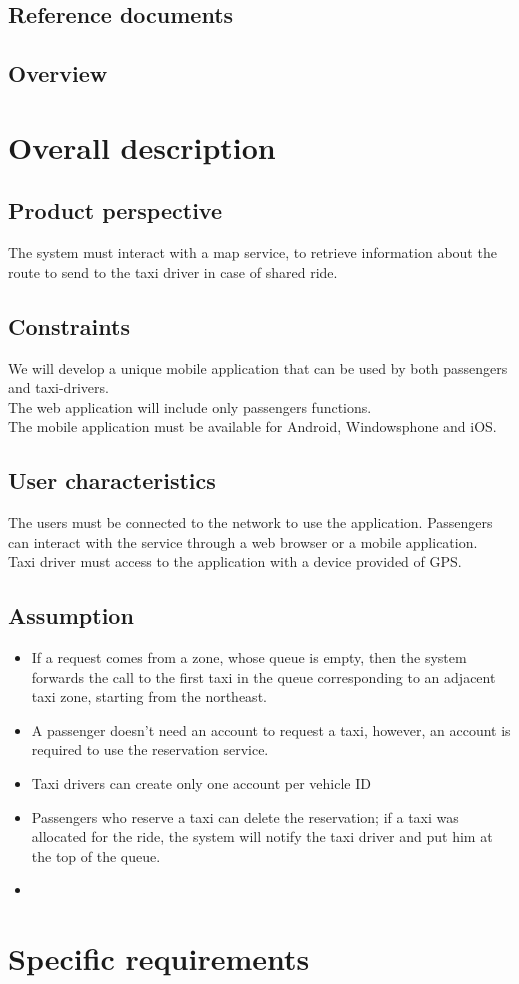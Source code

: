 \documentclass[a4paper,11pt]{report}
\begin{document}
\section{Reference documents}

\section{Overview}


\chapter*{Overall description}
\addtocounter{chapter}{1}
\section{Product perspective}
The system must interact with a map service, to retrieve information about the route to send to the taxi driver in case of shared ride.
\section{Constraints}
We will develop a unique mobile application that can be used by both passengers and taxi-drivers.\\
The web application will include only passengers functions.\\
The mobile application must be available for Android, Windowsphone and iOS.\\
\section{User characteristics}
The users must be connected to the network to use the application.
Passengers can interact with the service through a web browser or a mobile application.\\
Taxi driver must access to the application with a device provided of GPS.
\section{Assumption}
\begin{itemize}
  \item If a request comes from a zone, whose queue is empty, then the system forwards the call to the first taxi in the queue corresponding to an adjacent taxi zone, starting from the northeast.
  \item A passenger doesn't need an account to request a taxi, however, an account is required to use the reservation service. %
  \item Taxi drivers can create only one account per vehicle ID %
  \item Passengers who reserve a taxi can delete the reservation; if a taxi was allocated for the ride, the system will notify the taxi driver and put him at the top of the queue.
  \item
\end{itemize}
\chapter*{Specific requirements}
\addtocounter{chapter}{1}
\end{document}
